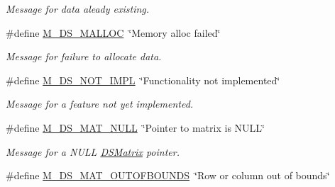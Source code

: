 \begin{DoxyCompactItemize}
\begin{DoxyCompactList}\small\item\em Message for data aleady existing. \item\end{DoxyCompactList}\item 
\hypertarget{group___m___d_s___messages_ga47106b8852d8baaf66a0e7f9bd67d36b}{
\#define \hyperlink{group___m___d_s___messages_ga47106b8852d8baaf66a0e7f9bd67d36b}{M\_\-DS\_\-MALLOC}~\char`\"{}Memory alloc failed\char`\"{}}
\label{group___m___d_s___messages_ga47106b8852d8baaf66a0e7f9bd67d36b}

\begin{DoxyCompactList}\small\item\em Message for failure to allocate data. \item\end{DoxyCompactList}\item 
\hypertarget{group___m___d_s___messages_ga79c48eacc7951aa68e4d094f0989faac}{
\#define \hyperlink{group___m___d_s___messages_ga79c48eacc7951aa68e4d094f0989faac}{M\_\-DS\_\-NOT\_\-IMPL}~\char`\"{}Functionality not implemented\char`\"{}}
\label{group___m___d_s___messages_ga79c48eacc7951aa68e4d094f0989faac}

\begin{DoxyCompactList}\small\item\em Message for a feature not yet implemented. \item\end{DoxyCompactList}\item 
\hypertarget{group___m___d_s___messages_gad80933e02bded8d239593be18ed3dea9}{
\#define \hyperlink{group___m___d_s___messages_gad80933e02bded8d239593be18ed3dea9}{M\_\-DS\_\-MAT\_\-NULL}~\char`\"{}Pointer to matrix is NULL\char`\"{}}
\label{group___m___d_s___messages_gad80933e02bded8d239593be18ed3dea9}

\begin{DoxyCompactList}\small\item\em Message for a NULL \hyperlink{struct_d_s_matrix}{DSMatrix} pointer. \item\end{DoxyCompactList}\item 
\hypertarget{group___m___d_s___messages_gaeb861d5820b984719e6f2ff0ed0d66d5}{
\#define \hyperlink{group___m___d_s___messages_gaeb861d5820b984719e6f2ff0ed0d66d5}{M\_\-DS\_\-MAT\_\-OUTOFBOUNDS}~\char`\"{}Row or column out of bounds\char`\"{}}
\label{group___m___d_s___messages_gaeb861d5820b984719e6f2ff0ed0d66d5}


\end{DoxyCompactItemize}
